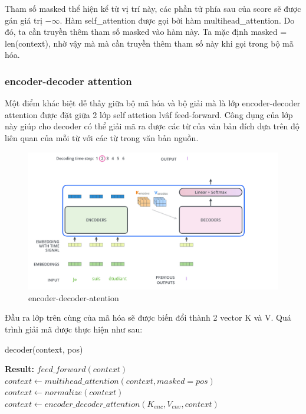 Tham số masked thể hiện kể từ vị trí này, các phần tử phía sau của score sẽ được gán giá trị $-\infty$. Hàm self\_attention được gọi bởi hàm multihead\_attention. Do đó, ta cần truyền thêm tham số masked vào hàm này. Ta mặc định masked = len(context), nhờ vậy mà mà cần truyền thêm tham số này khi gọi trong bộ mã hóa.


\subsubsection{encoder-decoder attention}
Một điểm khác biệt dễ thấy giữa bộ mã hóa và bộ giải mà là lớp encoder-decoder attention được đặt giữa 2 lớp self attetion lvâf feed-forward. Công dụng của lớp này giúp cho decoder có thể giải mã ra được các từ của văn bản đích dựa trên độ liên quan của mỗi từ với các từ trong văn bản nguồn. 

\begin{figure}[H]
    \begin{center}
        \includegraphics[scale=0.4]{images/encoder-decoder-attention}
        \caption{encoder-decoder-atention}
        \label{fig:encoder-decoder-attention}
    \end{center}
\end{figure}

Đầu ra lớp trên cùng của mã hóa sẽ được biến đổi thành 2 vector K và V. Quá trình giải mã được thực hiện như sau:


\begin{algorithm}[H]
    \caption{decoder(context, pos)}
    \begin{algorithmic}[1]
		\State \textbf{Result:} $feed\_forward(context)$
		\State $context \gets multihead\_attention(context, masked = pos)$
		\State $context \gets normalize(context)$
		\State $context \gets encoder\_decoder\_attention(K_{enc}, V_{env}, context)$
    \end{algorithmic}
\end{algorithm}

